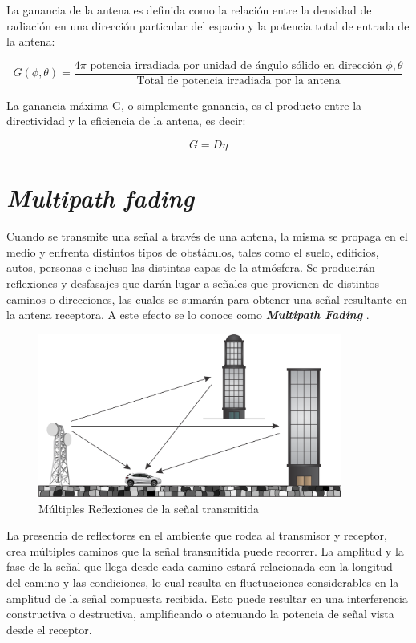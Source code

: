 La ganancia de la antena es definida como la relación entre la densidad de radiación en una dirección particular del espacio y la potencia total de entrada de la antena:

\begin{equation}
G(\phi,\theta) = \frac{4 \pi \text{ potencia irradiada por unidad de ángulo sólido en dirección } \phi,\theta }{\text{Total de potencia irradiada por la antena}}
\end{equation}

La ganancia máxima G, o simplemente ganancia, es el producto entre la directividad y la eficiencia de la antena, es decir:

\begin{equation}
G = D \eta
\end{equation}

\section{\textit{Multipath fading}}

Cuando se transmite una señal a través de una antena, la misma se propaga en el medio y enfrenta distintos tipos de obstáculos, tales como el suelo, edificios, autos, personas e incluso las distintas capas de la atmósfera. Se producirán reflexiones y desfasajes que darán lugar a señales que provienen de distintos caminos o direcciones, las cuales se sumarán para obtener una señal resultante en la antena receptora. A este efecto se lo conoce como \textbf{\textit{Multipath Fading}} \cite{Pahlavan}.

\begin{figure}[htb!]
        \centering
        \includegraphics[width=10cm]{./figures/C02-multipath_fading}
        \caption{Múltiples Reflexiones de la señal transmitida}
        \label{fig:MultipathFading}
\end{figure}

La presencia de reflectores en el ambiente que rodea al transmisor y receptor, crea múltiples caminos que la señal transmitida puede recorrer. La amplitud y la fase de la señal que llega desde cada camino estará relacionada con la longitud del camino y las condiciones, lo cual resulta en fluctuaciones considerables en la amplitud de la señal compuesta recibida. Esto puede resultar en una interferencia constructiva o destructiva, amplificando o atenuando la potencia de señal vista desde el receptor.

